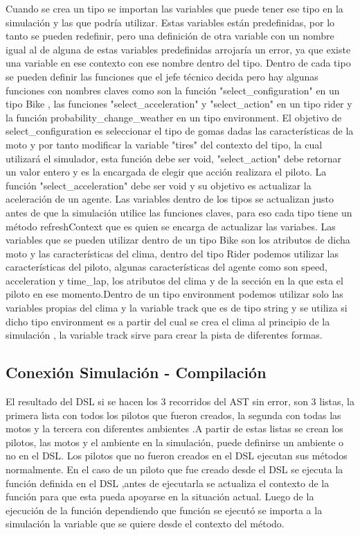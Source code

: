 \documentclass[12pt, letterpaper,spanish]{article}
\theoremstyle{definition}
\theoremstyle{remark}
\begin{document}
        Cuando se crea un tipo se importan las variables que puede tener ese tipo en la simulación y las que podría utilizar. Estas variables están predefinidas, por lo tanto se pueden redefinir, pero una definición de otra variable con un nombre igual al de alguna de estas variables predefinidas arrojaría un error, ya que existe una variable en ese contexto con ese nombre dentro del tipo. Dentro de cada tipo se pueden definir las funciones que el jefe técnico decida pero hay algunas funciones con nombres claves como son la función "select\_configuration" en un tipo Bike , las funciones "select\_acceleration" y "select\_action" en un tipo rider y la función probability_change_weather en un tipo environment. El objetivo de select\_configuration es seleccionar el tipo de gomas dadas las características de la moto y por tanto modificar la variable "tires" del contexto del tipo, la cual utilizará el simulador, esta función debe ser void, "select\_action" debe retornar un valor entero y es la encargada de elegir que acción realizara el piloto. La función "select\_acceleration" debe ser void y su objetivo es actualizar la aceleración de un agente. Las variables dentro de los tipos se actualizan justo antes de que la simulación utilice las funciones claves, para eso cada tipo tiene un método refreshContext que es quien se encarga de actualizar las variabes. Las variables que se pueden utilizar dentro de un tipo Bike son los atributos de dicha moto y las características del clima, dentro del tipo Rider podemos utilizar las características del piloto, algunas características del agente como son speed, acceleration
        y time\_lap, los atributos del clima y de la sección en la que esta el piloto en ese momento.Dentro de un tipo environment podemos utilizar solo las variables propias del clima y la variable track que es de tipo string y se utiliza si dicho tipo environment es a partir del cual se crea el clima al principio de la simulación , la variable track sirve para crear la pista de diferentes formas.      


	\subsection{Conexión Simulación - Compilación}
		El resultado del DSL si se hacen los 3 recorridos del AST sin error, son 3 listas, la primera lista con todos los pilotos que fueron
        creados, la segunda con todas las motos y la tercera con diferentes ambientes .A partir de estas listas se crean los pilotos, las motos y el ambiente en la simulación, puede definirse un ambiente o no en el DSL. 
        Los pilotos que no fueron creados en el DSL ejecutan sus métodos normalmente. En el caso de un piloto que fue creado desde el DSL se ejecuta la función definida en el DSL ,antes de ejecutarla se actualiza el contexto de la función para que esta pueda apoyarse en la situación actual. Luego de la ejecución de la función dependiendo que función se ejecutó se importa a la simulación la variable que se quiere desde el contexto del método.    
			
\end{document}

